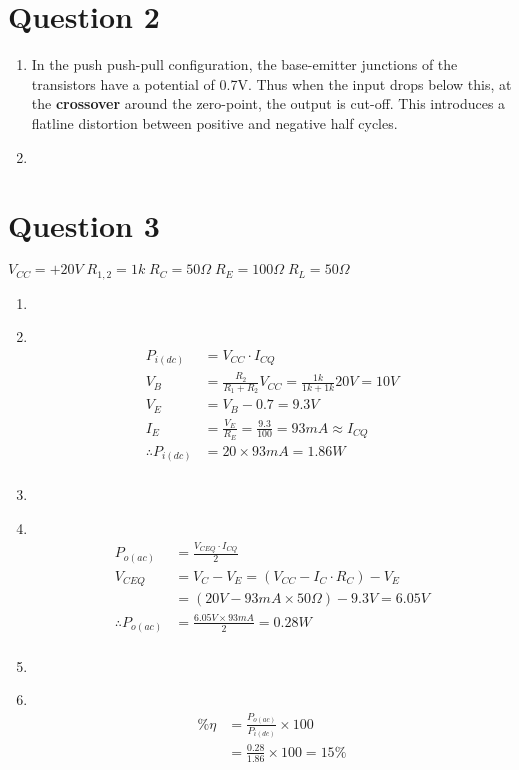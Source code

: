 \documentclass[11pt]{article}
\newcommand\Item[1][]{%
  \ifx\relax#1\relax  \item \else \item[#1] \fi
  \abovedisplayskip=0pt\abovedisplayshortskip=0pt~\vspace*{-\baselineskip}}
\begin{document}
  \section*{Question 2}
  \begin{enumerate}[label=\alph*)]
    \item %
    In the push push-pull configuration, the base-emitter junctions of the transistors have a potential of 0.7V. Thus when the input drops below this, at the \textbf{crossover} around the zero-point, the output is cut-off. This introduces a flatline distortion between positive and negative half cycles.
    
    \item %
    
    
  \end{enumerate}
  
\newpage
\section*{Question 3}
  $V_{CC} = +20V \; R_{1,2} = 1k \; R_C = 50\Omega \; R_E = 100\Omega \; R_L = 50\Omega$

  \begin{enumerate}[label=\roman*)]
    \Item %
      \begin{align*}
        P_{i(dc)} &= V_{CC}{\cdot}I_{CQ} \\
        V_{B} &= \frac{R_{2}}{R_{1}+R_{2}}V_{CC} = \frac{1k}{1k+1k}20V = 10V \\
        V_{E} &= V_{B} - 0.7 = 9.3V \\
        I_{E} &= \frac{V_{E}}{R_{E}} = \frac{9.3}{100} = 93mA \approx I_{CQ} \\
        \therefore P_{i(dc)} &= 20 \times 93mA = 1.86W \\
      \end{align*}

    \Item %
      \begin{align*}
        P_{o(ac)} &= \frac{V_{CEQ}{\cdot}I_{CQ}}{2} \\
        V_{CEQ}   &= V_{C} - V_{E} = (V_{CC} - I_{C}{\cdot}R_{C}) - V_{E} \\
                  &= (20V - 93mA \times 50\Omega) - 9.3V = 6.05V \\ 
        \therefore P_{o(ac)} &= \frac{6.05V \times 93mA}{2} = 0.28W \\
      \end{align*}

    \Item %
      \begin{align*}
        \% \eta &= \frac{P_{o(ac)}}{P_{i(dc)}} \times 100 \\
                &= \frac{0.28}{1.86} \times 100 = 15\%  \\
      \end{align*}
  \end{enumerate}
\end{document}
